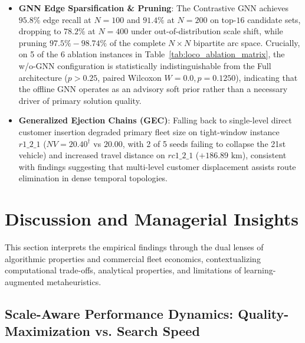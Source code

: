 \documentclass{ieeeaccess}
\begin{document}
\begin{itemize}
    \item \textbf{GNN Edge Sparsification \& Pruning}: The Contrastive GNN achieves $95.8\%$ edge recall at $N=100$ and $91.4\%$ at $N=200$ on top-$16$ candidate sets, dropping to $78.2\%$ at $N=400$ under out-of-distribution scale shift, while pruning $97.5\%-98.74\%$ of the complete $N \times N$ bipartite arc space. Crucially, on 5 of the 6 ablation instances in Table~\ref{tab:loco_ablation_matrix}, the w/o-GNN configuration is statistically indistinguishable from the Full architecture ($p > 0.25$, paired Wilcoxon $W=0.0, p=0.1250$), indicating that the offline GNN operates as an advisory soft prior rather than a necessary driver of primary solution quality.
    \item \textbf{Generalized Ejection Chains (GEC)}: Falling back to single-level direct customer insertion degraded primary fleet size on tight-window instance $r1\_2\_1$ ($NV=20.40^\dagger$ vs $20.00$, with 2 of 5 seeds failing to collapse the 21st vehicle) and increased travel distance on $rc1\_2\_1$ ($+186.89\text{ km}$), consistent with findings suggesting that multi-level customer displacement assists route elimination in dense temporal topologies.
\end{itemize}

\section{Discussion and Managerial Insights}
\label{sec:discussion}

This section interprets the empirical findings through the dual lenses of algorithmic properties and commercial fleet economics, contextualizing computational trade-offs, analytical properties, and limitations of learning-augmented metaheuristics.

\subsection{Scale-Aware Performance Dynamics: Quality-Maximization vs. Search Speed}
\label{sec:disc_scale_aware}
\end{document}
